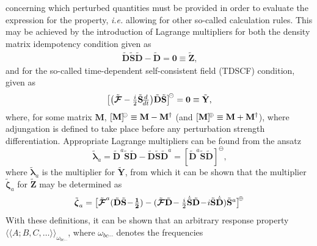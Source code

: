 \documentclass[%
 reprint,
 amsmath,amssymb,
 aps,
]{revtex4-1}
\begin{document}
concerning which perturbed quantities must be provided in order to evaluate the
expression for the property, \textit{i.e.} allowing for other so-called
calculation rules. This may be achieved by the introduction of Lagrange
multipliers for both the density matrix idempotency condition given as
\begin{eqnarray}\label{idempotency}
\tilde{\mathbf{D}} \tilde{\mathbf{S}} \tilde{\mathbf{D}} - \tilde{\mathbf{D}} = \mathbf{0} \equiv \tilde{\mathbf{Z}}
\text{,}
\end{eqnarray}
and for the so-called time-dependent self-consistent field (TDSCF) condition, given as
\begin{eqnarray}\label{TDSCF}
\bigr[\bigl(\tilde{\mbox{\boldmath $ \mathcal{F} $}} - {\textstyle \frac{i}{2}} \tilde{\mathbf{S}}
\!{\textstyle \frac{d}{dt}} \bigr) \tilde{\mathbf{D}} \tilde{\mathbf{S}} \bigr]^{\negmedspace\circleddash} = \mathbf{0} \equiv \tilde{\mathbf{Y}}
\text{,}
\end{eqnarray}
where, for some matrix $\mathbf{M}$, $[\mathbf{M}]^{\negmedspace\circleddash}
\equiv \mathbf{M} - \mathbf{M}^{\dagger}$ (and
$[\mathbf{M}]^{\negmedspace\oplus} \equiv \mathbf{M} + \mathbf{M}^{\dagger}$),
where adjungation is defined to take place before any perturbation
 strength differentiation. Appropriate Lagrange multipliers can
be found from the ansatz
\begin{equation}
\tilde{\bm{\lambda}}_a = \tilde{\mathbf{D}}^{a}\tilde{\mathbf{S}} \tilde{\mathbf{D}}-\tilde{\mathbf{D}} \tilde{\mathbf{S}} \tilde{\mathbf{D}}^{a}=[\tilde{\mathbf{D}}^{a}\tilde{\mathbf{S}} \tilde{\mathbf{D}}]^{\!\ominus} \label{LagrMulXg} \text{,}
\end{equation}
where $\tilde{\bm{\lambda}}_{a}$ is the multiplier for $\tilde{\mathbf{Y}}$,
from which it can be shown  that the multiplier
$\tilde{\bm{\zeta}}_a$ for $\tilde{\mathbf{Z}}$ may be determined as
\begin{equation}
\tilde{\mbox{\boldmath $ \zeta $}}_a=\bigl[\tilde{\mbox{\boldmath $ \mathcal{F} $}}^{a}(\tilde{\mathbf{D}} \tilde{\mathbf{S}}\!-\!{\textstyle \mathbf{\frac{1}{2}}})-(\tilde{\mbox{\boldmath $ \mathcal{F} $}} \tilde{\mathbf{D}}\!-{\textstyle \frac{i}{2}}\dot{\tilde{\mathbf{S}}} \tilde{\mathbf{D}}
\!-\! i\tilde{\mathbf{S}} \dot{\tilde{\mathbf{D}}})\tilde{\mathbf{S}}^{a}\bigr]^{\negmedspace\oplus}\label{LagrMulLg}
\end{equation}
With these definitions, it can be shown  that an arbitrary response
property $\langle \langle A ; B, C, \ldots \rangle
\rangle_{\omega_{bc\cdots}}$, where $\omega_{bc\cdots}$ denotes the frequencies
\end{document}
